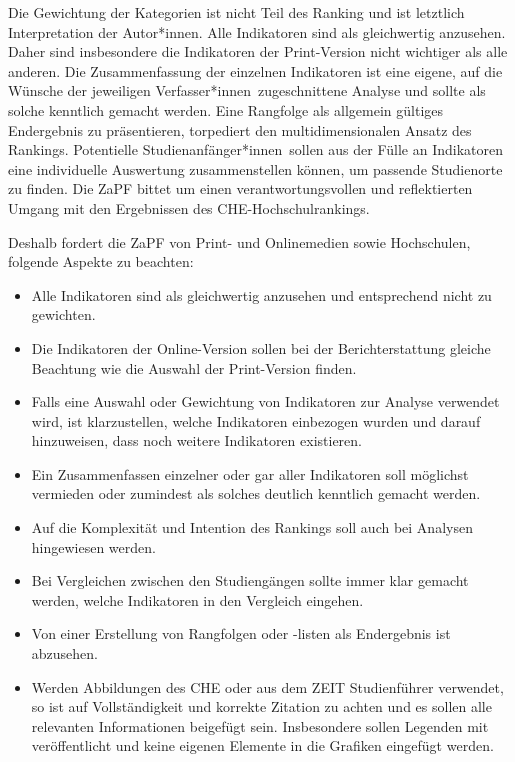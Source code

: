 \documentclass[DIV=calc]{scrartcl}
\newcommand{\gen}{*innen}
\begin{document}
    Die Gewichtung der Kategorien ist nicht Teil des Ranking und ist letztlich Interpretation der Autor\gen. Alle Indikatoren sind als gleichwertig anzusehen. Daher sind insbesondere die Indikatoren der Print-Version nicht wichtiger als alle anderen. Die Zusammenfassung der einzelnen Indikatoren ist eine eigene, auf die Wünsche der jeweiligen Verfasser\gen\ zugeschnittene Analyse und sollte als solche kenntlich gemacht werden. Eine Rangfolge als allgemein gültiges Endergebnis zu präsentieren, torpediert den multidimensionalen Ansatz des Rankings. Potentielle Studienanfänger\gen\ sollen aus der Fülle an Indikatoren eine individuelle Auswertung zusammenstellen können, um passende Studienorte zu finden. Die ZaPF bittet um einen verantwortungsvollen und reflektierten Umgang mit den Ergebnissen des
    CHE-Hochschulrankings. 
    
    Deshalb fordert die ZaPF von Print- und Onlinemedien
    sowie Hochschulen, folgende Aspekte zu beachten:
    
    \begin{itemize}
        \item Alle Indikatoren sind als gleichwertig anzusehen und entsprechend nicht zu
        gewichten.
        \item Die Indikatoren der Online-Version sollen bei der Berichterstattung gleiche
        Beachtung wie die Auswahl der Print-Version finden.
        \item Falls eine Auswahl oder Gewichtung von Indikatoren zur Analyse verwendet
        wird, ist klarzustellen, welche Indikatoren einbezogen wurden und darauf
        hinzuweisen, dass noch weitere Indikatoren existieren.
        \item Ein Zusammenfassen einzelner oder gar aller Indikatoren soll möglichst vermieden oder zumindest als solches deutlich kenntlich gemacht werden.
        \item Auf die Komplexität und Intention des Rankings soll auch bei Analysen hingewiesen werden.
        \item Bei Vergleichen zwischen den Studiengängen sollte immer klar gemacht werden, welche Indikatoren in den Vergleich eingehen.
        \item Von einer Erstellung von Rangfolgen oder -listen als Endergebnis ist abzusehen.
        \item Werden Abbildungen des CHE oder aus dem ZEIT Studienführer verwendet,
        so ist auf Vollständigkeit und korrekte Zitation zu achten und es sollen alle
        relevanten Informationen beigefügt sein. Insbesondere sollen Legenden mit
        veröffentlicht und keine eigenen Elemente in die Grafiken eingefügt werden.
    \end{itemize}
    
\end{document}
